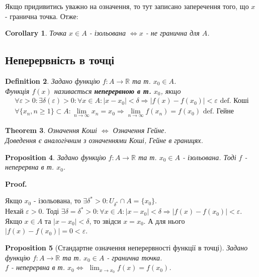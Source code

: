 \documentclass[a4paper, 14pt]{article}
\makeatletter
\def\huge{\displaystyle}
\def\qed{$\blacksquare$}
\theoremstyle{theoremdd}
\newtheorem{theorem}{Theorem}[subsection]
\theoremstyle{theoremdd}
\newtheorem{definition}[theorem]{Definition}
\theoremstyle{theoremdd}
\theoremstyle{theoremdd}
\theoremstyle{theoremdd}
\newtheorem{proposition}[theorem]{Proposition}
\theoremstyle{theoremdd}
\theoremstyle{theoremdd}
\theoremstyle{theoremdd}
\newtheorem{corollary}[theorem]{Corollary}
\renewenvironment{proof}[1][Proof.\\]{\par
\pushQED{\hfill \qed}%
\normalfont \topsep6\p@\@plus6\p@\relax
\trivlist
\item\relax
{\bfseries
#1\@addpunct{.}}\hspace\labelsep\ignorespaces
}{%
\popQED\endtrivlist\@endpefalse
}
\makeatother
\begin{document}
Якщо придивитись уважно на означення, то тут записано заперечення того, що $x$ - гранична точка. Отже:
\begin{corollary}
Точка $x \in A$ - ізольована $\iff x$ - не гранична для $A$.
\end{corollary}

\subsection{Неперервність в точці}
\begin{definition}
Задано функцію $f: A \to \mathbb{R}$ та т. $x_0 \in A$.\\
Функція $f(x)$ називається \textbf{неперервною в т.} $x_0$, якщо
\begin{align*}
\forall \varepsilon > 0: \exists \delta(\varepsilon) > 0: \forall x \in A: |x-x_0| < \delta \Rightarrow |f(x)-f(x_0)| < \varepsilon \text{ def. Коші} \\
\forall \{x_n, n \geq 1\} \subset A: \huge\lim_{n \to \infty} x_n = x_0 \Rightarrow \huge\lim_{n \to \infty} f(x_n) = f(x_0) \text{ def. Гейне}
\end{align*}
\end{definition}

\begin{theorem}
Означення Коші $\iff$ Означення Гейне.\\
\textit{Доведення є аналогічним з означеннями Коші, Гейне в границях.}
\end{theorem}

\begin{proposition}
Задано функцію $f: A \to \mathbb{R}$ та т. $x_0 \in A$ - ізольована. Тоді $f$ - неперервна в т. $x_0$.
\end{proposition}

\begin{proof}
Якщо $x_0$ - ізольована, то $\exists \delta^* > 0: U_{\delta^*} \cap A = \{x_0\}$.\\
Нехай $\varepsilon > 0$. Тоді $\exists \delta = \delta^* > 0: \forall x \in A: |x-x_0|< \delta \Rightarrow |f(x)-f(x_0)|<\varepsilon$.\\
Якщо $x \in A$ та $|x-x_0|< \delta$, то звідси $x=x_0$. А для нього $|f(x)-f(x_0)| = 0 < \varepsilon$.
\end{proof}

\begin{proposition}[Стандартне означення неперервності функції в точці]
Задано функцію $f: A \to \mathbb{R}$ та т. $x_0 \in A$ - гранична точка.\\
$f$ - неперервна в т. $x_0 \iff$ $\huge\lim_{x \to x_0} f(x) = f(x_0)$.
\end{proposition}
\end{document}
